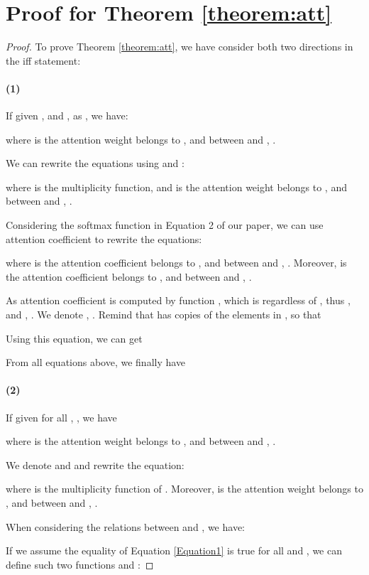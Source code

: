 \documentclass[letterpaper]{article} \usepackage{aaai20}  \usepackage{times}  \usepackage{helvet} \usepackage{courier}  \usepackage[hyphens]{url}  \usepackage{graphicx} \urlstyle{rm} \def\UrlFont{\rm}  \usepackage{graphicx}  \frenchspacing  \setlength{\pdfpagewidth}{8.5in}  \setlength{\pdfpageheight}{11in}
\theoremstyle{plain}
\theoremstyle{definition}
\begin{document}
\section{Proof for Theorem \ref{theorem:att}}
\begin{proof}
To prove Theorem \ref{theorem:att}, we have consider both two directions in the iff statement:

\paragraph{(1)} If given ,  and , as , we have:

where  is the attention weight belongs to , and between  and , .

We can rewrite the equations using  and : 


where  is the multiplicity function, and  is the attention weight belongs to , and between  and , .

Considering the softmax function in Equation 2 of our paper, we can use attention coefficient  to rewrite the equations:

where  is the attention coefficient belongs to , and between  and , . Moreover,  is the attention coefficient belongs to , and between  and , .

As attention coefficient  is computed by function , which is regardless of , thus ,  and , . We denote , . Remind that  has  copies of the elements in , so that


Using this equation, we can get


From all equations above, we finally have





\paragraph{(2)} If given  for all , , we have 

where  is the attention weight belongs to , and between  and , .

We denote  and  and rewrite the equation: 

where  is the multiplicity function of . Moreover,  is the attention weight belongs to , and between  and , . 

When considering the relations between  and , we have: 


If we assume the equality of Equation \ref{Equation1} is true for all  and , we can define such two functions  and : 



\end{proof}
\end{document}
